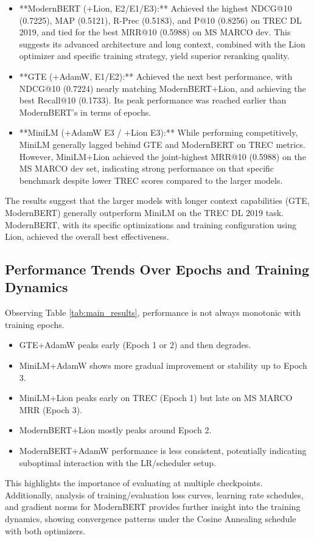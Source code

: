 \documentclass[conference]{IEEEtran}
\begin{document}
\begin{itemize}
    \item **ModernBERT (+Lion, E2/E1/E3):** Achieved the highest NDCG@10 (0.7225), MAP (0.5121), R-Prec (0.5183), and P@10 (0.8256) on TREC DL 2019, and tied for the best MRR@10 (0.5988) on MS MARCO dev. This suggests its advanced architecture and long context, combined with the Lion optimizer and specific training strategy, yield superior reranking quality.
    \item **GTE (+AdamW, E1/E2):** Achieved the next best performance, with NDCG@10 (0.7224) nearly matching ModernBERT+Lion, and achieving the best Recall@10 (0.1733). Its peak performance was reached earlier than ModernBERT's in terms of epochs.
    \item **MiniLM (+AdamW E3 / +Lion E3):** While performing competitively, MiniLM generally lagged behind GTE and ModernBERT on TREC metrics. However, MiniLM+Lion achieved the joint-highest MRR@10 (0.5988) on the MS MARCO dev set, indicating strong performance on that specific benchmark despite lower TREC scores compared to the larger models.
\end{itemize}
The results suggest that the larger models with longer context capabilities (GTE, ModernBERT) generally outperform MiniLM on the TREC DL 2019 task. ModernBERT, with its specific optimizations and training configuration using Lion, achieved the overall best effectiveness.

\subsection{Performance Trends Over Epochs and Training Dynamics}
Observing Table \ref{tab:main_results}, performance is not always monotonic with training epochs.
\begin{itemize}
    \item GTE+AdamW peaks early (Epoch 1 or 2) and then degrades.
    \item MiniLM+AdamW shows more gradual improvement or stability up to Epoch 3.
    \item MiniLM+Lion peaks early on TREC (Epoch 1) but late on MS MARCO MRR (Epoch 3).
    \item ModernBERT+Lion mostly peaks around Epoch 2.
    \item ModernBERT+AdamW performance is less consistent, potentially indicating suboptimal interaction with the LR/scheduler setup.
\end{itemize}
This highlights the importance of evaluating at multiple checkpoints. Additionally, analysis of training/evaluation loss curves, learning rate schedules, and gradient norms for ModernBERT provides further insight into the training dynamics, showing convergence patterns under the Cosine Annealing schedule with both optimizers.
\end{document}
